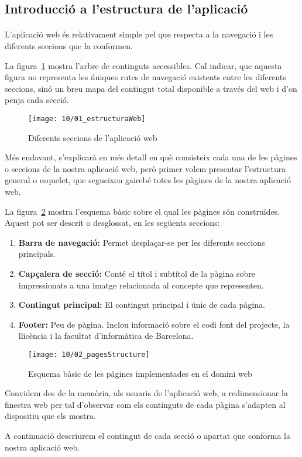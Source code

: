 \subsection{Introducció a l'estructura de l'aplicació}\label{sec:introStructure}

    \paragraph{}
    L'aplicació web és relativament simple pel que respecta a la navegació i les diferents seccions que la conformen.

    La figura~\ref{fig:webStructure} mostra l'arbre de continguts accessibles. Cal indicar, que aquesta figura no representa les úniques rutes de navegació existents entre les diferents seccions, sinó un breu mapa del contingut total disponible a través del web i d’on penja cada secció.

    \begin{figure}[h]
        \texttt{[image: 10/01\_estructuraWeb]}
        \centering
        \caption{Diferents seccions de l'aplicació web}\label{fig:webStructure}
    \end{figure}

    Més endavant, s’explicarà en més detall en què consisteix cada una de les pàgines o seccions de la nostra aplicació web, però primer volem presentar l'estructura general o esquelet, que segueixen gairebé totes les pàgines de la nostra aplicació web.

    La figura~\ref{fig:pageStructure} mostra l'esquema bàsic sobre el qual les pàgines són construïdes. Aquest pot ser descrit o desglossat, en les següents seccions:

    \begin{enumerate}
        \item \textbf{Barra de navegació:} Permet desplaçar-se per les diferents seccions principals.
        \item \textbf{Capçalera de secció:} Conté el títol i subtítol de la pàgina sobre im\-pre\-ssio\-nats a una imatge relacionada al concepte que representen.
        \item \textbf{Contingut principal:} El contingut principal i únic de cada pàgina.
        \item \textbf{Footer:} Peu de pàgina. Inclou informació sobre el codi font del projecte, la llicència i la facultat d'informàtica de Barcelona.
    \end{enumerate}

    \begin{figure}[h]
        \texttt{[image: 10/02\_pagesStructure]}
        \centering
        \caption{Esquema bàsic de les pàgines implementades en el domini web}\label{fig:pageStructure}
    \end{figure}

    Convidem des de la memòria, als usuaris de l'aplicació web, a redimensionar la finestra web per tal d'observar com els continguts de cada pàgina s’adapten al dispositiu que els mostra.

    A continuació descriurem el contingut de cada secció o apartat que conforma la nostra aplicació web.
